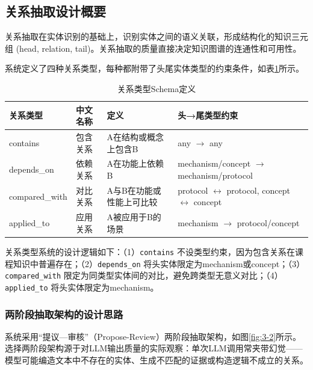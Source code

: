 \subsection{关系抽取设计概要}

关系抽取在实体识别的基础上，识别实体之间的语义关联，形成结构化的知识三元组 (head, relation, tail)。关系抽取的质量直接决定知识图谱的连通性和可用性。

系统定义了四种关系类型，每种都附带了头尾实体类型的约束条件，如表\ref{tab:3-2}所示。

\begin{table}[ht]
    \centering
    \caption{关系类型Schema定义}\label{tab:3-2}
    \small
    \begin{tabular}{p{2.3cm}p{2.0cm}p{3.9cm}p{3.9cm}}
    \toprule
    \textbf{关系类型} & \textbf{中文名称} & \textbf{定义} & \textbf{头→尾类型约束} \\
    \midrule
    contains & 包含关系 & A在结构或概念上包含B & any $\to$ any \\
    depends\_on & 依赖关系 & A在功能上依赖B & mechanism/concept $\to$ mechanism/protocol \\
    compared\_with & 对比关系 & A与B在功能或性能上可比较 & protocol $\leftrightarrow$ protocol, concept $\leftrightarrow$ concept \\
    applied\_to & 应用关系 & A被应用于B的场景 & mechanism $\to$ protocol/concept \\
    \bottomrule
    \end{tabular}
\end{table}

关系类型系统的设计逻辑如下：（1）\texttt{contains} 不设类型约束，因为包含关系在课程知识中普遍存在；（2）\texttt{depends\_on} 将头实体限定为mechanism或concept；（3）\texttt{compared\_with} 限定为同类型实体间的对比，避免跨类型无意义对比；（4）\texttt{applied\_to} 将头实体限定为mechanism。

\subsubsection{两阶段抽取架构的设计思路}

系统采用“提议—审核”（Propose-Review）两阶段抽取架构，如图\ref{fig:3-2}所示。选择两阶段架构源于对LLM输出质量的实际观察：单次LLM调用常夹带幻觉——模型可能编造文本中不存在的实体、生成不匹配的证据或构造逻辑不成立的关系。


